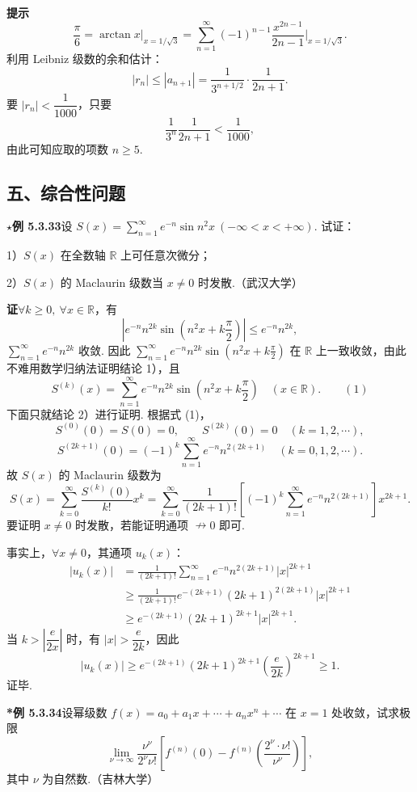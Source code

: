 \documentclass[UTF8,12pt,a4paper,fontset=fandol]{ctexart}
\begin{document}
\noindent\textbf{提示}\quad
\[
  \frac\pi6=\arctan x\bigg|_{x=1/\sqrt3}
  =\sum_{n=1}^{\infty}(-1)^{n-1}\frac{x^{2n-1}}{2n-1}\bigg|_{x=1/\sqrt3}.
\]
利用 Leibniz 级数的余和估计：
\[
  |r_n|\le|a_{n+1}|=\frac1{3^{n+1/2}}\cdot\frac1{2n+1}.
\]
要 $|r_n|<\dfrac1{1000}$，只要
\[
  \frac1{3^n}\frac1{2n+1}<\frac1{1000},
\]
由此可知应取的项数 $n\ge5$.

\subsection*{五、综合性问题}

\noindent\(\star\)\textbf{例 5.3.33}\quad 设
$S(x)=\displaystyle\sum_{n=1}^{\infty}e^{-n}\sin n^2x\ (-\infty<x<+\infty)$. 试证：

1）$S(x)$ 在全数轴 $\mathbb R$ 上可任意次微分；

2）$S(x)$ 的 Maclaurin 级数当 $x\ne0$ 时发散.（武汉大学）

\noindent\textbf{证}\quad $\forall k\ge0,\ \forall x\in\mathbb R$，有
\[
  \left|e^{-n}n^{2k}\sin\left(n^2x+k\frac\pi2\right)\right|\le e^{-n}n^{2k},
\]
$\displaystyle\sum_{n=1}^{\infty}e^{-n}n^{2k}$ 收敛. 因此
$\displaystyle\sum_{n=1}^{\infty}e^{-n}n^{2k}\sin\left(n^2x+k\frac\pi2\right)$ 在 $\mathbb R$ 上一致收敛，由此不难用数学归纳法证明结论 1），且
\[
  S^{(k)}(x)=\sum_{n=1}^{\infty}e^{-n}n^{2k}\sin\left(n^2x+k\frac\pi2\right)
  \quad(x\in\mathbb R). \qquad(1)
\]
下面只就结论 2）进行证明. 根据式 (1)，
\[
  S^{(0)}(0)=S(0)=0,\qquad S^{(2k)}(0)=0\quad(k=1,2,\cdots),
\]
\[
  S^{(2k+1)}(0)=(-1)^k\sum_{n=1}^{\infty}e^{-n}n^{2(2k+1)}
  \quad(k=0,1,2,\cdots).
\]
故 $S(x)$ 的 Maclaurin 级数为
\[
  S(x)=\sum_{k=0}^{\infty}\frac{S^{(k)}(0)}{k!}x^k
  =\sum_{k=0}^{\infty}\frac1{(2k+1)!}
  \left[(-1)^k\sum_{n=1}^{\infty}e^{-n}n^{2(2k+1)}\right]x^{2k+1}.
\]
要证明 $x\ne0$ 时发散，若能证明通项 $\nrightarrow0$ 即可.

事实上，$\forall x\ne0$，其通项 $u_k(x)$：
\[
\begin{aligned}
|u_k(x)|
&=\frac1{(2k+1)!}\sum_{n=1}^{\infty}e^{-n}n^{2(2k+1)}|x|^{2k+1}\\
&\ge\frac1{(2k+1)!}e^{-(2k+1)}(2k+1)^{2(2k+1)}|x|^{2k+1}\\
&\ge e^{-(2k+1)}(2k+1)^{2k+1}|x|^{2k+1}.
\end{aligned}
\]
当 $k>\left|\dfrac{e}{2x}\right|$ 时，有 $|x|>\dfrac e{2k}$，因此
\[
  |u_k(x)|\ge e^{-(2k+1)}(2k+1)^{2k+1}\left(\frac e{2k}\right)^{2k+1}\ge1.
\]
证毕.

\noindent\textbf{*例 5.3.34}\quad 设幂级数
$f(x)=a_0+a_1x+\cdots+a_nx^n+\cdots$ 在 $x=1$ 处收敛，试求极限
\[
  \lim_{\nu\to\infty}\frac{\nu^\nu}{2^\nu\nu!}
  \left[f^{(n)}(0)-f^{(n)}\left(\frac{2^\nu\cdot\nu!}{\nu^\nu}\right)\right],
\]
其中 $\nu$ 为自然数.（吉林大学）
\end{document}
